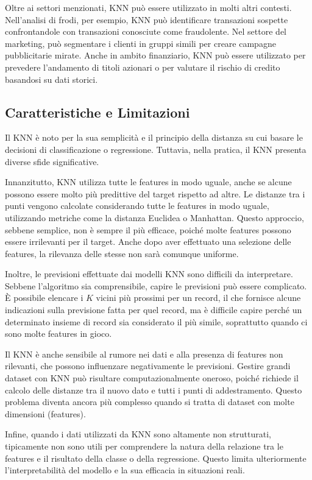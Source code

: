 Oltre ai settori menzionati, KNN può essere utilizzato in molti altri contesti. 
Nell'analisi di frodi, per esempio, KNN può identificare transazioni sospette 
confrontandole con transazioni conosciute come fraudolente. Nel settore del marketing, 
può segmentare i clienti in gruppi simili per creare campagne pubblicitarie mirate. 
Anche in ambito finanziario, KNN può essere utilizzato per prevedere l'andamento di 
titoli azionari o per valutare il rischio di credito basandosi su dati storici.

\subsection{Caratteristiche e Limitazioni}

Il KNN è noto per la sua semplicità e il principio della distanza su cui basare le decisioni 
di classificazione o regressione. Tuttavia, nella pratica, 
il KNN presenta diverse sfide significative.

Innanzitutto, KNN utilizza tutte le features in modo uguale, anche se alcune 
possono essere molto più predittive del target rispetto ad altre. Le distanze tra i 
punti vengono calcolate considerando tutte le features in modo uguale, utilizzando
metriche come la distanza Euclidea o Manhattan. Questo approccio, sebbene semplice, 
non è sempre il più efficace, poiché molte features possono essere irrilevanti per 
il target. Anche dopo aver effettuato una selezione delle features, la rilevanza 
delle stesse non sarà comunque uniforme.

Inoltre, le previsioni effettuate dai modelli KNN sono difficili da interpretare. 
Sebbene l'algoritmo sia comprensibile, capire le previsioni può essere complicato. È
possibile elencare i $K$ vicini più prossimi per un record, il che fornisce alcune 
indicazioni sulla previsione fatta per quel record, ma è difficile capire perché un 
determinato insieme di record sia considerato il più simile, soprattutto quando ci sono 
molte features in gioco.

Il KNN è anche sensibile al rumore nei dati e alla presenza di features non rilevanti, 
che possono influenzare negativamente le previsioni. Gestire grandi dataset con KNN può 
risultare computazionalmente oneroso, poiché richiede il calcolo delle distanze tra il nuovo 
dato e tutti i punti di addestramento. Questo problema diventa ancora più complesso quando 
si tratta di dataset con molte dimensioni (features).

Infine, quando i dati utilizzati da KNN sono altamente non strutturati, tipicamente non 
sono utili per comprendere la natura della relazione tra le features e il risultato 
della classe o della regressione. Questo limita ulteriormente l'interpretabilità del modello e 
la sua efficacia in situazioni reali.

